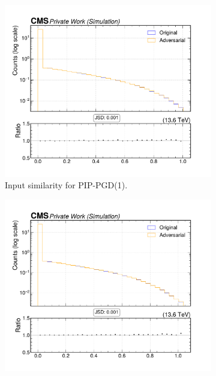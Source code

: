\begin{figure}[htbp]
  \centering
  \begin{subfigure}[t]{0.32\textwidth}
    \includegraphics[width=\linewidth]{media/output/features/compare/combined_it_1/cmp_vtx_arr_sv_enratio.pdf}
    \caption*{Input similarity for PIP-PGD(1).}
  \end{subfigure}\hfill
  \begin{subfigure}[t]{0.32\textwidth}
    \includegraphics[width=\linewidth]{media/output/features/compare/combined_it_2/cmp_vtx_arr_sv_enratio.pdf}

\end{subfigure}
\end{figure}
